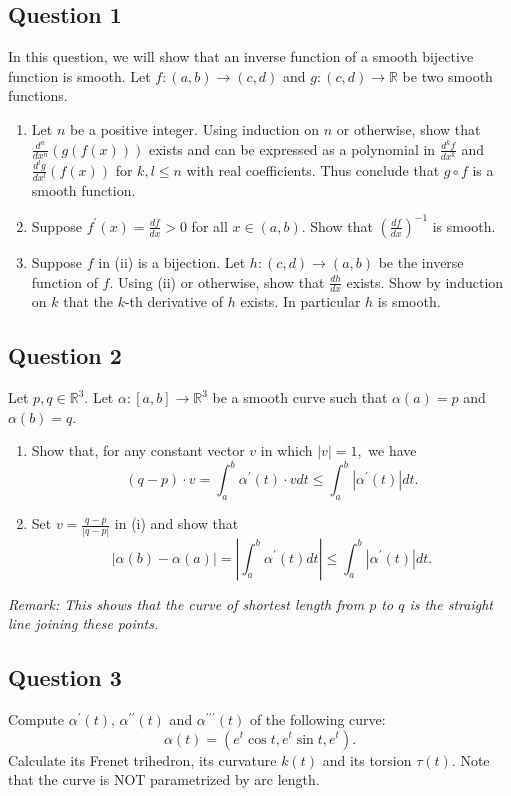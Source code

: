 \documentclass[12pt, a4paper]{article}
\newcommand{\R}{\mathbb{R}}
\begin{document}
\subsection*{Question 1}
In this question, we will show that an inverse function of a smooth bijective function is smooth. Let $f:(a,b)\rightarrow(c,d)$ and $g:(c,d)\rightarrow\R$ be two smooth functions.
\begin{enumerate}[label=(\roman*)]
    \item Let $n$ be a positive integer. Using induction on $n$ or otherwise, show that $\frac{d^{n}}{dx^{n}}(g(f(x)))$ exists and can be expressed as a polynomial in $\frac{d^{k}f}{dx^{k}}$ and $\frac{d^{l}g}{dx^{l}}(f(x))$ for $k,l\le n$ with real coefficients. Thus conclude that $g\circ f$ is a smooth function.
    \item Suppose $f^{\prime}(x)=\frac{df}{dx}>0$ for all $x\in(a,b)$. Show that $(\frac{df}{dx})^{-1}$ is smooth.
    \item Suppose $f$ in (ii) is a bijection. Let $h:(c,d)\rightarrow(a,b)$ be the inverse function of $f$. Using (ii) or otherwise, show that $\frac{dh}{dx}$ exists. Show by induction on $k$ that the $k$-th derivative of $h$ exists. In particular $h$ is smooth.
\end{enumerate}
\newpage

\subsection*{Question 2}
Let $p,q\in\R^{3}$. Let $\alpha:[a,b]\rightarrow\R^{3}$ be a smooth curve such that $\alpha(a)=p$ and $\alpha(b)=q$.
\begin{enumerate}[label=(\roman*)]
    \item Show that, for any constant vector $v$ in which $|v|=1,$ we have
    \[ (q-p)\cdot v=\int_{a}^{b}\alpha^{\prime}(t)\cdot vdt\le\int_{a}^{b}|\alpha^{\prime}(t)|dt. \]
    \item Set $v=\frac{q-p}{|q-p|}$ in (i) and show that
    \[ |\alpha(b)-\alpha(a)|=\left|\int_{a}^{b}\alpha^{\prime}(t)dt\right|\le\int_{a}^{b}|\alpha^{\prime}(t)|dt. \]
\end{enumerate}
\vspace{1em}
\noindent\textit{Remark: This shows that the curve of shortest length from $p$ to $q$ is the straight line joining these points.}
\newpage

\subsection*{Question 3}
Compute $\alpha^{\prime}(t)$, $\alpha^{\prime\prime}(t)$ and $\alpha^{\prime\prime\prime}(t)$ of the following curve:
\[ \alpha(t)=(e^{t}\cos t,e^{t}\sin t,e^{t}). \]
Calculate its Frenet trihedron, its curvature $k(t)$ and its torsion $\tau(t)$. Note that the curve is NOT parametrized by arc length.
\end{document}
